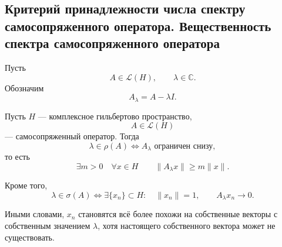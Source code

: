\subsection{Критерий принадлежности числа спектру самосопряженного оператора.
	Вещественность спектра самосопряженного оператора}

\begin{definition}
	Пусть
	\[
	A\in\mathcal{L}(H),
	\qquad
	\lambda\in\mathbb{C}.
	\]
	Обозначим
	\[
	A_\lambda=A-\lambda I.
	\]
\end{definition}

\begin{theorem}
	Пусть \(H\) --- комплексное гильбертово пространство,
	\[
	A\in\mathcal{L}(H)
	\]
	--- самосопряженный оператор. Тогда
	\[
	\lambda\in\rho(A)
	\Longleftrightarrow
	A_\lambda \text{ ограничен снизу},
	\]
	то есть
	\[
	\exists m>0
	\quad
	\forall x\in H
	\qquad
	\|A_\lambda x\|\geqslant m\|x\|.
	\]
	
	Кроме того,
	\[
	\lambda\in\sigma(A)
	\Longleftrightarrow
	\exists \{x_n\}\subset H:
	\quad
	\|x_n\|=1,
	\qquad
	A_\lambda x_n\to0.
	\]
\end{theorem}

\begin{idea} 
	Иными словами, $x_n$ становятся всё более похожи на собственные векторы с собственным значением $\lambda$, хотя настоящего собственного вектора может не существовать.
\end{idea}

